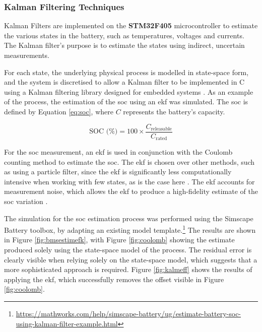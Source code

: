 \subsubsection{Kalman Filtering Techniques}
\label{kalm}

Kalman Filters are implemented on the \textbf{STM32F405} microcontroller to estimate the various states in the battery, such as temperatures, voltages and currents. The Kalman filter's purpose is to estimate the states using indirect, uncertain measurements. 

For each state, the underlying physical process is modelled in state-space form, and the system is discretised to allow a Kalman filter to be implemented in C using a Kalman filtering library designed for embedded systems \cite{computers11110165}. As an example of the process, the estimation of the \gls{soc} using an \gls{ekf} was simulated. The \gls{soc} is defined by Equation \ref{eq:soc}, where $C$ represents the battery's capacity.

\begin{equation}
\label{eq:soc}
\text{SOC (\%)} = 100 \times \frac{C_{\text{releasable}}}{C_{\text{rated}}}
\end{equation}

For the \gls{soc} measurement, an \gls{ekf} is used in conjunction with the Coulomb counting method to estimate the \gls{soc}. The \gls{ekf} is chosen over other methods, such as using a particle filter, since the \gls{ekf} is significantly less computationally intensive when working with few states, as is the case here \cite{STELZER20171483}. The \gls{ekf} accounts for measurement noise, which allows the \gls{ekf} to produce a high-fidelity estimate of the \gls{soc} variation \cite{Zaki2025}.

 The simulation for the \gls{soc} estimation process was performed using the Simscape Battery toolbox, by adapting an existing model template.\footnote{\url{https://mathworks.com/help/simscape-battery/ug/estimate-battery-soc-using-kalman-filter-example.html}} The results are shown in Figure \ref{fig:bmsestimefk}, with Figure \ref{fig:coolomb} showing the estimate produced solely using the state-space model of the process. The residual error is clearly visible when relying solely on the state-space model, which suggests that a more sophisticated approach is required. Figure \ref{fig:kalmeff} shows the results of applying the \gls{ekf}, which successfully removes the offset visible in Figure \ref{fig:coolomb}.


